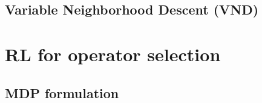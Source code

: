 \documentclass[preprint,12pt]{elsarticle}
\begin{document}

\subsection{Variable Neighborhood Descent (VND)}

\section{RL for operator selection}
\label{sec:rl_operator}

\subsection{MDP formulation}
\end{document}
